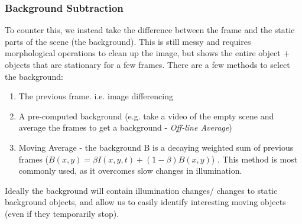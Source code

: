 \subsubsection{Background Subtraction}
To counter this, we instead take the difference between the frame and the static parts of the scene (the background). This is still messy and requires morphological operations to clean up the image, but shows the entire object + objects that are stationary for a few frames. There are a few methods to select the background:
\begin{enumerate}
    \item The previous frame. i.e. image differencing
    \item A pre-computed background (e.g. take a video of the empty scene and average the frames to get a background - \emph{Off-line Average})
    \item Moving Average - the background B is a decaying weighted sum of previous frames ($ B(x,y) = \beta I(x,y,t) + (1-\beta )B(x,y)$) . This method is most commonly used, as it overcomes slow changes in illumination.
\end{enumerate}
Ideally the background will contain illumination changes/ changes to static background objects, and allow us to easily identify interesting moving objects (even if they temporarily stop).